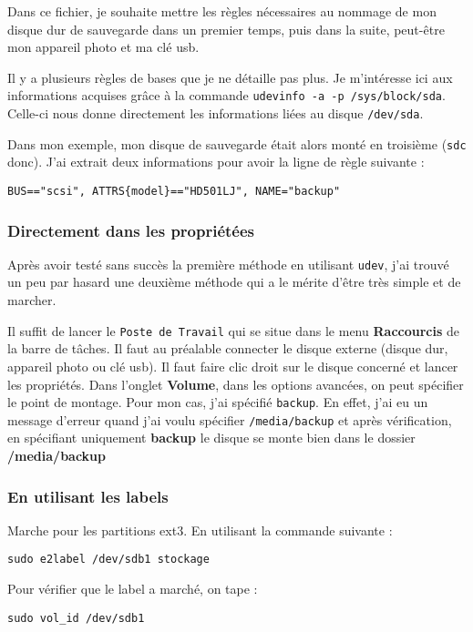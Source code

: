 \documentclass[a4paper,twoside]{article}
\begin{document}
Dans ce fichier, je souhaite mettre les règles nécessaires au nommage de mon disque dur de sauvegarde dans un premier temps, puis dans la suite, peut-être mon appareil photo et ma clé usb.

Il y a plusieurs règles de bases que je ne détaille pas plus. Je m'intéresse ici aux informations acquises grâce à la commande \verb|udevinfo -a -p /sys/block/sda|. Celle-ci nous donne directement les informations liées au disque \texttt{/dev/sda}.

Dans mon exemple, mon disque de sauvegarde était alors monté en troisième (\texttt{sdc} donc). J'ai extrait deux informations pour avoir la ligne de règle suivante :
\begin{verbatim}
BUS=="scsi", ATTRS{model}=="HD501LJ", NAME="backup"
\end{verbatim}
\subsubsection{Directement dans les propriétées}
Après avoir testé sans succès la première méthode en utilisant \texttt{udev}, j'ai trouvé un peu par hasard une deuxième méthode qui a le mérite d'être très simple et de marcher.

Il suffit de lancer le \texttt{Poste de Travail} qui se situe dans le menu \textbf{Raccourcis} de la barre de tâches. Il faut au préalable connecter le disque externe (disque dur, appareil photo ou clé usb). Il faut faire clic droit sur le disque concerné et lancer les propriétés. Dans l'onglet \textbf{Volume}, dans les options avancées, on peut spécifier le point de montage. Pour mon cas, j'ai spécifié \texttt{backup}. En effet, j'ai eu un message d'erreur quand j'ai voulu spécifier \texttt{/media/backup} et après vérification, en spécifiant uniquement \textbf{backup} le disque se monte bien dans le dossier \textbf{/media/backup}

\subsubsection{En utilisant les labels}
Marche pour les partitions ext3. En utilisant la commande suivante :

\begin{verbatim}
sudo e2label /dev/sdb1 stockage
\end{verbatim}

Pour vérifier que le label a marché, on tape :

\begin{verbatim}
sudo vol_id /dev/sdb1
\end{verbatim}
\end{document}
